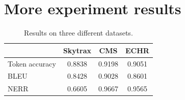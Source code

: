 













\section{More experiment results}
\label{appendix:time}

\begin{table}[ht]
\centering
\scalebox{1}
{
\begin{tabular}{|l|c|c|c|}
\hline
& Skytrax   &  CMS  &  ECHR  \\ \hline
Token accuracy  & 0.8838     & 0.9198
 & 0.9051
 \\ \hline
BLEU & 0.8428
 & 0.9028 & 0.8601 \\ \hline
NERR & 0.6605
 & 0.9667  & 0.9565
 \\ 
 \hline
\end{tabular}
}
\caption{Results on three different datasets.}
\label{fig:dataset}

\end{table}


